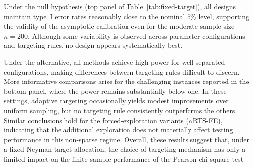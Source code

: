 %

Under the null hypothesis (top panel of Table~\ref{tab:fixed-target}),
	all designs maintain type~I error rates reasonably close to the nominal
	\(5\%\) level, supporting the validity of the asymptotic calibration even
	for the moderate sample size \(n=200\). Although some variability is
	observed across parameter configurations and targeting rules, no design
	appears systematically best.
	
	Under the alternative, all methods achieve high power for well-separated configurations, making differences between targeting rules difficult to discern. More informative comparisons arise for the challenging instances reported in the bottom panel, where the power remains substantially below one. In these settings, adaptive targeting occasionally yields modest
	improvements over uniform sampling, but no targeting rule consistently outperforms the others. Similar conclusions hold for the forced-exploration variants (\(\alpha\)RTS-FE), indicating that the
	additional exploration does not materially affect testing performance in this non-sparse regime.	Overall, these results suggest that, under a fixed Neyman target allocation, the choice of targeting mechanism has only a limited impact on the finite-sample performance of the Pearson chi-square test



